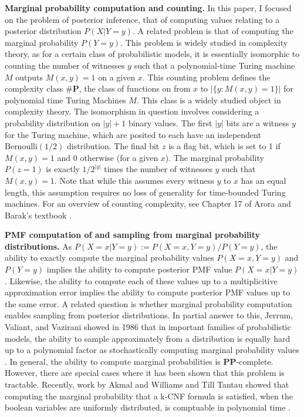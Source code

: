\documentclass{article}
\renewcommand{\P}{\mathbf{P}}
\def \PP{\P\P}
\theoremstyle{definition}
\theoremstyle{remark}
\begin{document}
\textbf{Marginal probability computation and counting.}
In this paper, I focused on the problem of posterior inference, that of computing values relating to a posterior distribution $P(X | Y = y)$.
A related problem is that of computing the marginal probability $P(Y = y)$.
This problem is widely studied in complexity theory, as for a certain class of probabilistic models, it is essentially isomorphic to counting the number of witnesses $y$ such that a polynomial-time Turing machine $M$ outputs $M(x, y) = 1$ on a given $x$.
This counting problem defines the complexity class $\#\P$, the class of functions on from $x$ to $|\{y : M(x, y) = 1\}|$ for polynomial time Turing Machines $M$. This class is a widely studied object in complexity theory.
The isomorphism in question involves considering a probability distribution on $|y| + 1$ binary values.
The first $|y|$ bits are a witness $y$ for the Turing machine, which are posited to each have an independent $\text{Bernoulli}(1/2)$ distribution.
The final bit $z$ is a flag bit, which is set to 1 if $M(x, y) = 1$ and 0 otherwise (for a given $x$).
The marginal probability $P(z = 1)$ is exactly $1/2^{|y|}$ times the number of witnesses $y$ such that $M(x, y) = 1$.
Note that while this assumes every witness $y$ to $x$ has an equal length, this assumption requires no loss of generality for time-bounded Turing machines.
For an overview of counting complexity, see Chapter 17 of Arora and Barak's textbook \cite{arora2009computational}.

\textbf{PMF computation of and sampling from marginal probability distributions.}
As $P(X = x | Y = y) := P(X = x, Y = y) / P(Y = y)$, the ability to exactly compute the marginal probability values $P(X = x, Y = y)$ and $P(Y = y)$ implies the ability to compute posterior PMF value $P(X = x | Y = y)$.
Likewise, the ability to compute each of these values up to a multiplicitive approximation error implies the ability to compute posterior PMF values up to the same error.
A related question is whether marginal probability computation enables sampling from posterior distributions.
In partial answer to this, Jerrum, Valiant, and Vazirani showed in 1986 that in important families of probabilistic models, the ability to sample approximately from a distribution is equally hard up to a polynomial factor as stochastically computing marginal probability values \cite{jerrum1986}.
In general, the ability to compute marginal probabilities is $\PP$-complete.
However, there are special cases where it has been shown that this problem is tractable.
Recently, work by Akmal and Williams and Till Tantau showed that computing the marginal probability that a k-CNF formula is satisfied, when the boolean variables are uniformly distributed, is comptuable in polynomial time \cite{akmal2022majority,tantau2022satisfaction}.
\end{document}
